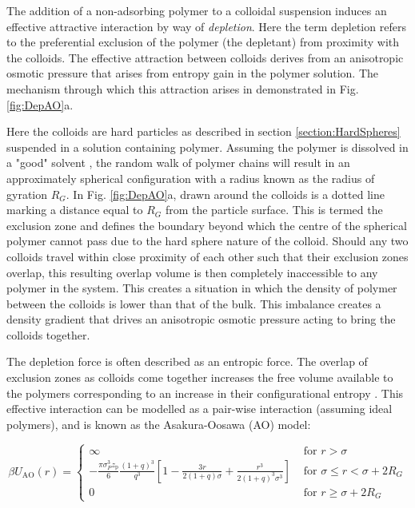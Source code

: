 The addition of a non-adsorbing polymer to a colloidal suspension induces an effective attractive interaction by way of \textit{depletion}. Here the term depletion refers to the preferential exclusion of the polymer (the depletant) from proximity with the colloids. The effective attraction between colloids derives from an anisotropic osmotic pressure that arises from entropy gain in the polymer solution. The mechanism through which this attraction arises in demonstrated in Fig. \ref{fig:DepAO}a.


Here the colloids are hard particles as described in section \ref{section:HardSpheres} suspended in a solution containing polymer. Assuming the polymer is dissolved in a "good" solvent \cite{berry1966,royall2007a}, the random walk of polymer chains will result in an approximately spherical configuration with a radius known as the radius of gyration $R_G$. In Fig. \ref{fig:DepAO}a, drawn around the colloids is a dotted line marking a distance equal to $R_G$ from the particle surface. This is termed the exclusion zone and defines the boundary beyond which the centre of the spherical polymer cannot pass due to the hard sphere nature of the colloid. Should any two colloids travel within close proximity of each other such that their exclusion zones overlap, this resulting overlap volume is then completely inaccessible to any polymer in the system. This creates a situation in which the density of polymer between the colloids is lower than that of the bulk. This imbalance creates a density gradient that drives an anisotropic osmotic pressure acting to bring the colloids together. 

The depletion force is often described as an entropic force. The overlap of exclusion zones as colloids come together increases the free volume available to the polymers corresponding to an increase in their configurational entropy \cite{lekkerkerker2011}.
This effective interaction can be modelled as a pair-wise interaction (assuming ideal polymers), and is known as the Asakura-Oosawa (AO) model:

\begin{equation}
	\beta U_{\mathrm{AO}}(r)=\left\{\begin{array}{ll}\infty & \text { for } r>\sigma \\ -\frac{\pi \sigma_{P}^{3} z_{\mathrm{p}}}{6} \frac{(1+q)^{3}}{q^{3}}\left[1-\frac{3 r}{2(1+q) \sigma}+\frac{r^{3}}{2(1+q)^{3} \sigma^{3}}\right] & \text { for } \sigma \leq r < \sigma+2R_G \\ 0 & \text { for } r \geq \sigma+2R_G\end{array}\right.
	\label{eq:AO}
\end{equation}

